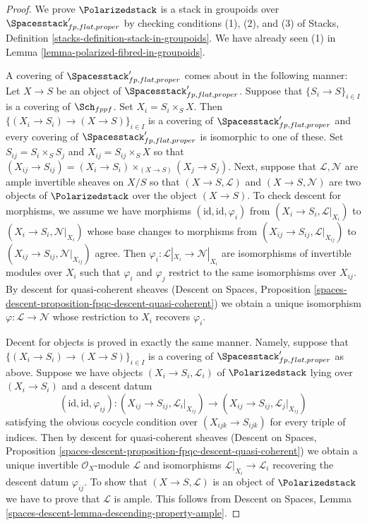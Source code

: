\begin{proof}
We prove $\Polarizedstack$ is a stack in groupoids over
$\Spacesstack'_{fp, flat, proper}$
by checking conditions (1), (2), and (3)
of Stacks, Definition \ref{stacks-definition-stack-in-groupoids}.
We have already seen (1) in
Lemma \ref{lemma-polarized-fibred-in-groupoids}.

\medskip\noindent
A covering of $\Spacesstack'_{fp, flat, proper}$ comes about
in the following manner: Let $X \to S$ be an object of
$\Spacesstack'_{fp, flat, proper}$. Suppose that
$\{S_i \to S\}_{i \in I}$ is a covering of $\Sch_{fppf}$.
Set $X_i = S_i \times_S X$. Then $\{(X_i \to S_i) \to (X \to S)\}_{i \in I}$
is a covering of $\Spacesstack'_{fp, flat, proper}$ and
every covering of $\Spacesstack'_{fp, flat, proper}$ is isomorphic
to one of these. Set $S_{ij} = S_i \times_S S_j$ and
$X_{ij} = S_{ij} \times_S X$ so that $(X_{ij} \to S_{ij}) =
(X_i \to S_i) \times_{(X \to S)} (X_j \to S_j)$.
Next, suppose that $\mathcal{L}, \mathcal{N}$
are ample invertible sheaves on $X/S$ so that
$(X \to S, \mathcal{L})$ and $(X \to S, \mathcal{N})$
are two objects of $\Polarizedstack$ over the object $(X \to S)$.
To check descent for morphisms, we assume we have morphisms
$(\text{id}, \text{id}, \varphi_i)$ from
$(X_i \to S_i, \mathcal{L}|_{X_i})$ to
$(X_i \to S_i, \mathcal{N}|_{X_i})$
whose base changes to morphisms from
$(X_{ij} \to S_{ij}, \mathcal{L}|_{X_{ij}})$ to
$(X_{ij} \to S_{ij}, \mathcal{N}|_{X_{ij}})$
agree. Then
$\varphi_i : \mathcal{L}|_{X_i} \to \mathcal{N}|_{X_i}$
are isomorphisms of invertible modules over $X_i$ such that
$\varphi_i$ and $\varphi_j$ restrict to the same
isomorphisms over $X_{ij}$.
By descent for quasi-coherent sheaves
(Descent on Spaces, Proposition
\ref{spaces-descent-proposition-fpqc-descent-quasi-coherent})
we obtain a unique isomorphism $\varphi : \mathcal{L} \to \mathcal{N}$
whose restriction to $X_i$ recovers $\varphi_i$.

\medskip\noindent
Decent for objects is proved in exactly the same manner.
Namely, suppose that
$\{(X_i \to S_i) \to (X \to S)\}_{i \in I}$
is a covering of $\Spacesstack'_{fp, flat, proper}$
as above.
Suppose we have objects $(X_i \to S_i, \mathcal{L}_i)$
of $\Polarizedstack$ lying over $(X_i \to S_i)$
and a descent datum
$$
(\text{id}, \text{id}, \varphi_{ij}) :
(X_{ij} \to S_{ij}, \mathcal{L}_i|_{X_{ij}})
\to
(X_{ij} \to S_{ij}, \mathcal{L}_j|_{X_{ij}})
$$
satisfying the obvious cocycle condition over
$(X_{ijk} \to S_{ijk})$ for every triple of indices.
Then by
 descent for quasi-coherent sheaves
(Descent on Spaces, Proposition
\ref{spaces-descent-proposition-fpqc-descent-quasi-coherent})
we obtain a unique invertible $\mathcal{O}_X$-module
$\mathcal{L}$ and isomorphisms $\mathcal{L}|_{X_i} \to \mathcal{L}_i$
recovering the descent datum $\varphi_{ij}$.
To show that
$(X \to S, \mathcal{L})$ is an object of
$\Polarizedstack$ we have to prove that
$\mathcal{L}$ is ample. This follows from
Descent on Spaces, Lemma \ref{spaces-descent-lemma-descending-property-ample}.


\end{proof}
